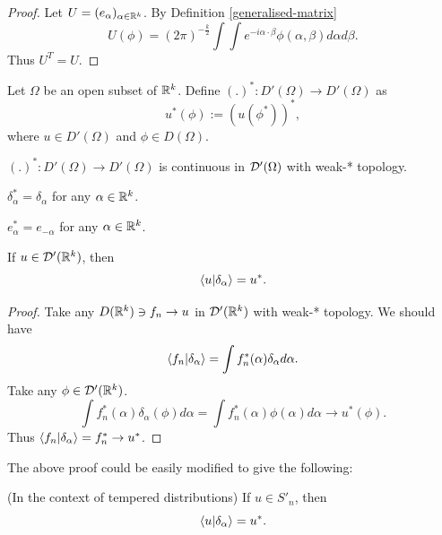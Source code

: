 \documentclass[main.tex]{subfiles}
\begin{document}
\begin{proof}
Let $U = (e_\alpha)_{\alpha\in\mathbb{R}^k}$. By Definition \ref{generalised-matrix} 
\begin{equation}
U(\phi) = (2\pi)^{-\frac{k}{2}} \int \int e^{-i\alpha \cdot \beta} \phi(\alpha, \beta) d\alpha d\beta .
\end{equation}
Thus $U^T = U$.
\end{proof}
\begin{definition}
Let $\Omega$ be an open subset of $\mathbb{R}^k$.
Define $(.)^*:D'(\Omega)\to D'(\Omega)$ as
\begin{equation}
u^*(\phi) := (u(\phi^*))^*,
\end{equation}
where $u\in D'(\Omega)$ and $\phi\in D(\Omega)$. 
\end{definition}
\begin{corollary}
$(.)^*:D'(\Omega)\to D'(\Omega)$ is continuous in $\mathcal{D}'(\Omega)$ with weak-* topology.
\end{corollary}
\begin{corollary}
$\delta_\alpha^* = \delta_\alpha$ for any $\alpha\in\mathbb{R}^k$.
\end{corollary}
\begin{corollary}
$e_\alpha^* = e_{-\alpha}$ for any $\alpha\in\mathbb{R}^k$.
\end{corollary}
\begin{theorem}
If $u\in \mathcal{D}'(\mathbb{R}^k)$, then
\begin{equation}
\braket{u}{\delta_\alpha} = u^*.
\end{equation}
\end{theorem}
\begin{proof}
Take any $D(\mathbb{R}^k)\ni f_n \to u$ in $\mathcal{D}'(\mathbb{R}^k)$ with weak-* topology.
We should have
\begin{equation}
\braket{f_n}{\delta_\alpha} = \int f^*_n(\alpha) \delta_\alpha d\alpha.
\end{equation}
Take any $\phi\in\mathcal{D}'(\mathbb{R}^k)$.
\begin{equation}
\int f^*_n(\alpha) \delta_\alpha(\phi) d\alpha = \int f^*_n(\alpha)\phi(\alpha) d\alpha \to u^*(\phi).
\end{equation}
Thus $\braket{f_n}{\delta_\alpha} = f^*_n \to u^*$. 
\end{proof}
The above proof could be easily modified to give the following:
\begin{theorem} (In the context of tempered distributions)
If $u\in S'_n$, then
\begin{equation}
\braket{u}{\delta_\alpha} = u^*.
\end{equation} 
\end{theorem}
\end{document}

